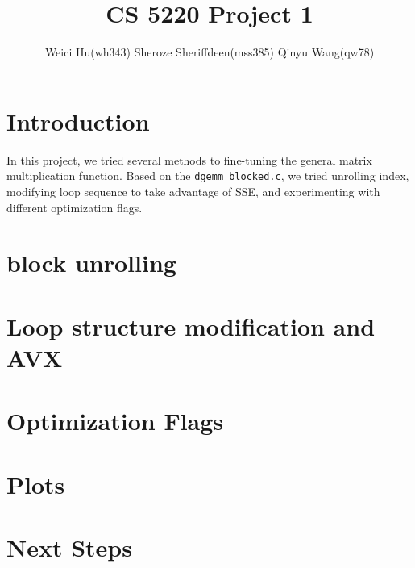 \documentclass[11pt]{article}
\theoremstyle{plain}
\theoremstyle{definition}
\begin{document}
\title{CS 5220 Project 1}
\author{Weici Hu(wh343) Sheroze Sheriffdeen(mss385) Qinyu Wang(qw78)}
\maketitle

\section{Introduction}
In this project, we tried several methods to fine-tuning the general matrix multiplication function.
Based on the \texttt{dgemm\_blocked.c}, we tried unrolling index, modifying loop sequence to take advantage of SSE, and experimenting with different optimization flags.

\section{block unrolling}

\section{Loop structure modification and AVX}

\section{Optimization Flags}

\section{Plots}

\section{Next Steps}





 
 
\end{document}
